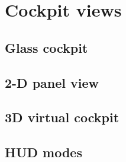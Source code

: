 \documentclass[Orbiter User Manual.tex]{subfiles}
\begin{document}
\section{Cockpit views}

\subsection{Glass cockpit}

\subsection{2-D panel view}

\subsection{3D virtual cockpit}

\subsection{HUD modes}
\end{document}
